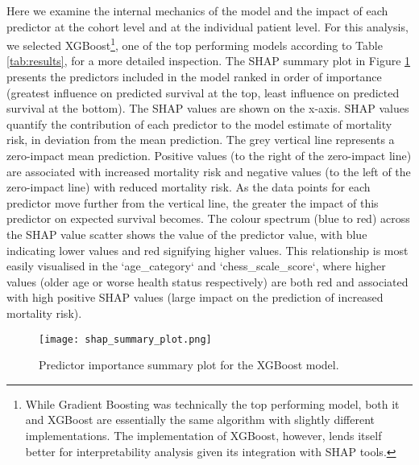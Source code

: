 \documentclass{article}
\begin{document}
Here we examine the internal mechanics of the model and the impact of each predictor at the cohort level and at the individual patient level. For this analysis, we selected XGBoost\footnote{While Gradient Boosting was technically the top performing model, both it and XGBoost are essentially the same algorithm with slightly different implementations. The implementation of XGBoost, however, lends itself better for interpretability analysis given its integration with SHAP tools. }, one of the top performing models according to Table \ref{tab:results},  for a more detailed inspection. The SHAP summary plot in Figure \ref{fig:importance} presents the predictors included in the model ranked in order of importance (greatest influence on predicted survival at the top, least influence on predicted survival at the bottom). The SHAP values are shown on the x-axis. SHAP values quantify the contribution of each predictor to the model estimate of mortality risk, in deviation from the mean prediction. The grey vertical line represents a zero-impact mean prediction. Positive values (to the right of the zero-impact line) are associated with increased mortality risk and negative values (to the left of the zero-impact line) with reduced mortality risk. As the data points for each predictor move further from the vertical line, the greater the impact of this predictor on expected survival becomes. The colour spectrum (blue to red) across the SHAP value scatter shows the value of the predictor value, with blue indicating lower values and red signifying higher values.  This relationship is most easily visualised in the `age\_category` and `chess\_scale\_score`, where higher values (older age or worse health status respectively) are both red and associated with high positive SHAP values (large impact on the prediction of increased mortality risk).

\begin{figure}[hbt]
    \centering
    \texttt{[image: shap\_summary\_plot.png]}
    \caption{Predictor importance summary plot for the XGBoost model.}
    \label{fig:importance}
\end{figure}
\end{document}
